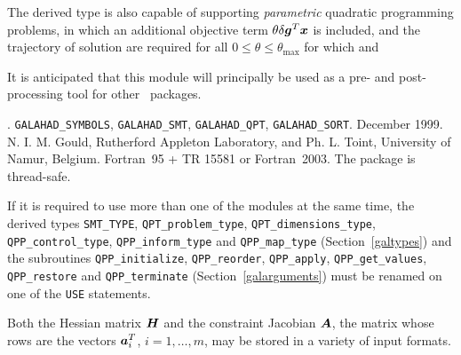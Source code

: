 \documentclass{galahad}
\newcommand{\packagename}{QPP}
\newcommand{\fullpackagename}{\libraryname\_\packagename}
\begin{document}
The derived type is also capable of supporting {\em parametric}
quadratic programming problems, in which an additional objective
term $\theta \delta {\bm{g}}^T {\bm{x}}$ is included, and the trajectory of 
solution are required for all $0 \leq \theta \leq \theta_{\max}$ 
for which
and 

It is anticipated that this module will principally be used as a pre- and 
post-processing tool for other \galahad\ packages.


\galattributes
\galversions{\tt  \fullpackagename\_single, \fullpackagename\_double}.
\galuses
{\tt GALAHAD\_SY\-M\-BOLS}, 
{\tt GALAHAD\_SMT}, 
{\tt GALAHAD\_QPT},
{\tt GALAHAD\_SORT}.
\galdate December 1999.
\galorigin N. I. M. Gould, Rutherford Appleton Laboratory, and
Ph. L. Toint, University of Namur, Belgium.
\gallanguage Fortran~95 + TR 15581 or Fortran~2003. 
The package is thread-safe.


\galhowto



\noindent
If it is required to use more than one of the modules at the same time, 
the derived types
{\tt SMT\_TYPE},
{\tt QPT\_problem\_type},
{\tt QPT\_dimensions\_type}, 
{\tt \packagename\_control\_type}, 
\sloppy
{\tt \packagename\_inform\_type} 
and
{\tt \packagename\_map\_type}
(Section~\ref{galtypes})
and the subroutines
{\tt \packagename\_initialize}, 
{\tt \packagename\_reorder},
{\tt \packagename\_apply}, 
{\tt \packagename\_get\_values}, 
{\tt \packagename\_restore}
and
{\tt \packagename\_terminate} 
(Section~\ref{galarguments})
must be renamed on one of the {\tt USE} statements.


\galmatrix

Both the Hessian matrix ${\bm{H}}$ and
the constraint Jacobian ${\bm{A}}$, the matrix 
whose rows are the vectors ${\bm{a}}_{i}^{T}$, $i = 1, \ldots , m$, 
may be stored in a variety of input formats.
\end{document}
